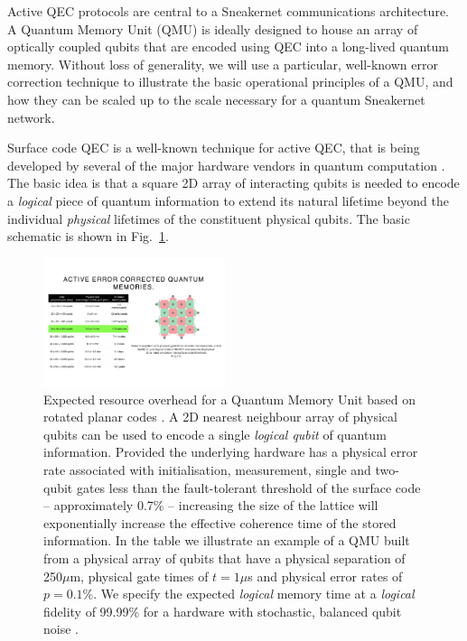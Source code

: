 \documentclass[twocolumn, aps, rmp, amsmath, amssymb, nofootinbib, superscriptaddress, longbibliography, floatfix, table-of-contents, eqsecnum]{revtex4-2}
\begin{document}
Active QEC protocols are central to a Sneakernet communications architecture. A Quantum Memory Unit (QMU) is ideally designed to house an array of optically coupled qubits that are encoded using QEC into a long-lived quantum memory. Without loss of generality, we will use a particular, well-known error correction technique to illustrate the basic operational principles of a QMU, and how they can be scaled up to the scale necessary for a quantum Sneakernet network.

Surface code QEC is a well-known technique for active QEC, that is being developed by several of the major hardware vendors in quantum computation \cite{SD-Fowler:2012aa}. The basic idea is that a square 2D array of interacting qubits is needed to encode a \textit{logical} piece of quantum information to extend its natural lifetime beyond the individual \textit{physical} lifetimes of the constituent physical qubits. The basic schematic is shown in Fig.~\ref{fig:array}. 

\begin{figure}[htbp!]
	\includegraphics[clip=true, width=0.475\textwidth]{array}
	\caption{Expected resource overhead for a Quantum Memory Unit based on rotated planar codes \cite{SD-Horsman:2012aa}. A 2D nearest neighbour array of physical qubits can be used to encode a single {\em logical qubit} of quantum information. Provided the underlying hardware has a physical error rate associated with initialisation, measurement, single and two-qubit gates less than the fault-tolerant threshold of the surface code -- approximately 0.7\% -- increasing the size of the lattice will exponentially increase the effective coherence time of the stored information.  In the table we illustrate an example of a QMU built from a physical array of qubits that have a physical separation of 250$\mu$m, physical gate times of $t=1\mu$s and physical error rates of $p=0.1\%$. We specify the expected {\em logical} memory time at a {\em logical} fidelity of 99.99\% for a hardware with stochastic, balanced qubit noise \cite{SD-Devitt:2016aa}.} 
	\label{fig:array}
\end{figure}
\end{document}
